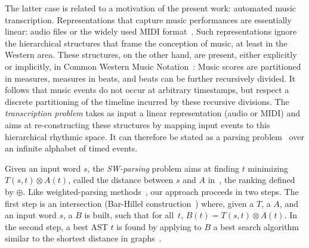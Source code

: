 The latter case is related to a motivation  of  the present work: 
automated music transcription. Representations that capture  music performances
are essentially linear:
audio files or the widely used
MIDI format~\cite{Selfridge-Field97beyondMIDI}. %
Such representations ignore the hierarchical structures that frame the
conception of music, at least in the Western area. These structures, on the other hand,
are present, either explicitly  or implicitly,
in Common Western Music Notation~\cite{Gould11Notation}:
Music scores are partitioned in measures,
measures in beats, and beats can be further recursively divided.
It follows that music events do not occur at arbitrary timestamps,
but respect a discrete partitioning of the  timeline incurred by
these recursive divisions.
The \emph{transcription problem} takes
as input a linear representation (audio or MIDI) and aims at re-constructing
these structures
by mapping input events to this hierarchical rhythmic space.
It can therefore be stated as a parsing problem~\cite{foscarin:hal-01988990}
over an infinite alphabet of timed events.

Given an input word $s$, the \emph{SW-parsing} problem aims at
finding $t$ minimizing
$T(s, t) \otimes A(t)$, called the distance between $s$ and $A$ in~\cite{Mohri03ijfcs},
\wrt the ranking defined by $\oplus$. Like weighted-parsing
methods~\cite{Goodman99SemiringParsing,Nederhof03weightedParsing,MorbitzVogler19weighted-parsing},
our approach proceeds in two steps.
The first step is an intersection
(Bar-Hillel construction~\cite{NederhofSatta03ParsingIntersection,GruneJacobs08parsing})
where, given a \SWT $T$, a \SWVPA $A$, and an input word $s$,
a \SWVPA $B$ %
is built, such that for all~$t$,
$B(t) = T(s, t) \otimes A(t)$. %
In the second step, a best AST $t$ is found by applying to $B$ %
a best search algorithm similar to the shortest distance
in graphs~\cite{Mohri02semiring,Huang05kbest}.
%

